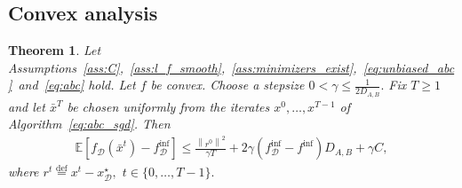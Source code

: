 \documentclass{article}
\newcommand{\bb}{\mathbb}
\newcommand{\norm}[1]{\left\| #1 \right\|}
\newcommand{\cD}{\mathcal{D}}
\newcommand{\eqdef}{\stackrel{\text{def}}{=}}
\newcommand{\Exp}[1]{{\bb E}\left[#1\right]}
\newtheorem{theorem}{Theorem}
\theoremstyle{plain}
\newcommand{\tf}{f_{\mathcal{D}}}
\theoremstyle{plain}
\theoremstyle{definition}
\theoremstyle{remark}
\begin{document}
\subsection{Convex analysis}
\begin{theorem}
	Let Assumptions~\ref{ass:C},~\ref{ass:l_f_smooth},~\ref{ass:minimizers_exist},~\ref{eq:unbiased_abc}~and~\ref{eq:abc} hold. Let $f$ be convex. Choose a stepsize $0<\gamma\leq\frac{1}{2D_{A,B}}.$ Fix $T\geq 1$ and let $\bar{x}^T$ be chosen uniformly from the iterates $x^0,\ldots,x^{T-1}$ of Algorithm~\ref{eq:abc_sgd}. Then
	\begin{equation}\label{eq:main_cvx_abc}
		\begin{split}
			\Exp{\tf(\bar{x}^t) - \tf^{\inf}} \leq \frac{\norm{r^0}^2}{\gamma T} + 2\gamma\left(\tf^{\inf} - f^{\inf}\right)D_{A,B}+\gamma C,
		\end{split}
	\end{equation}
	where $r^t\eqdef x^t - x_\cD^\star,$ $t\in\{0,\ldots,T-1\}.$
\end{theorem}
\end{document}
